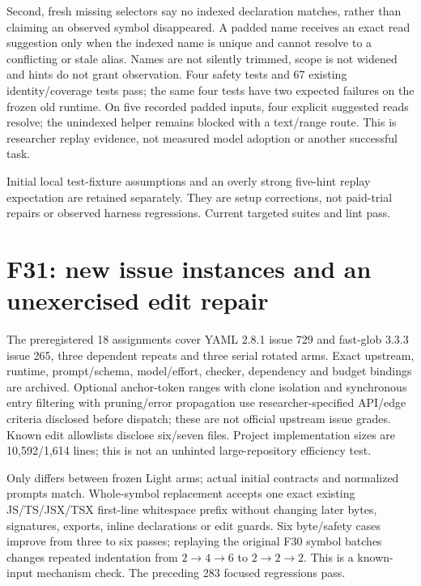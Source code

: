 \documentclass[11pt,a4paper]{article}
\newcommand{\code}[1]{\texttt{\detokenize{#1}}}
\begin{document}
Second, fresh missing selectors say no indexed declaration matches, rather than
claiming an observed symbol disappeared. A padded name receives an exact read
suggestion only when the indexed name is unique and cannot resolve to a conflicting
or stale alias. Names are not silently trimmed, scope is not widened and hints do
not grant observation. Four safety tests and 67 existing identity/coverage tests
pass; the same four tests have two expected failures on the frozen old runtime.
On five recorded padded inputs, four explicit suggested reads resolve; the
unindexed helper remains blocked with a text/range route. This is researcher
replay evidence, not measured model adoption or another successful task.

Initial local test-fixture assumptions and an overly strong five-hint replay
expectation are retained separately. They are setup corrections, not paid-trial
repairs or observed harness regressions. Current targeted suites and lint pass.

\section{F31: new issue instances and an unexercised edit repair}
The preregistered 18 assignments cover YAML 2.8.1 issue 729 and fast-glob 3.3.3
issue 265, three dependent repeats and three serial rotated arms. Exact upstream,
runtime, prompt/schema, model/effort, checker, dependency and budget bindings are
archived. Optional anchor-token ranges with clone isolation and synchronous entry
filtering with pruning/error propagation use researcher-specified API/edge criteria
disclosed before dispatch; these are not official upstream issue grades.
Known edit allowlists disclose six/seven files. Project implementation sizes are
10,592/1,614 lines; this is not an unhinted large-repository efficiency test.

Only \code{light-edit.js} differs between frozen Light arms; actual initial
contracts and normalized prompts match. Whole-symbol replacement accepts one
exact existing JS/TS/JSX/TSX first-line whitespace prefix without changing later
bytes, signatures, exports, inline declarations or edit guards. Six byte/safety
cases improve from three to six passes; replaying the original F30 symbol batches
changes repeated indentation from $2\to4\to6$ to $2\to2\to2$. This is a known-input
mechanism check. The preceding 283 focused regressions pass.
\end{document}
